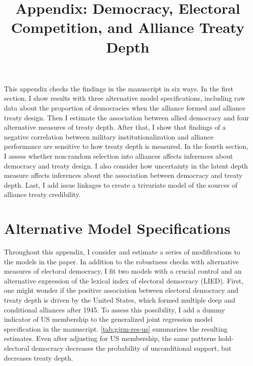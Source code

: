 \documentclass[12pt]{article}
\title{\textbf{Appendix: Democracy, Electoral Competition, and Alliance Treaty Depth}}
\author{}
\date{}
\begin{document}
\maketitle 

\doublespace 

This appendix checks the findings in the manuscript in six ways. 
In the first section, I show results with three alternative model specifications, including raw data about the proportion of democracies when the alliance formed and alliance treaty design.
Then I estimate the association between allied democracy and four alternative measures of treaty depth.
After that, I show that findings of a negative correlation between military institutionalization and alliance performance are sensitive to how treaty depth is measured. 
In the fourth section, I assess whether non-random selection into alliances affects inferences about democracy and treaty design.   
I also consider how uncertainty in the latent depth measure affects inferences about the association between democracy and treaty depth. 
Last, I add issue linkages to create a trivariate model of the sources of alliance treaty credibility. 


\section{Alternative Model Specifications} 


Throughout this appendix, I consider and estimate a series of modifications to the models in the paper.
In addition to the robustness checks with alternative measures of electoral democracy, I fit two models with a crucial control and an alternative expression of the lexical index of electoral democracy (LIED). 
First, one might wonder if the positive association between electoral democracy and treaty depth is driven by the United States, which formed multiple deep and conditional alliances after 1945. 
To assess this possibility, I add a dummy indicator of US membership to the generalized joint regression model specification in the manuscript. 
\autoref{tab:gjrm-res-us} summarizes the resulting estimates. 
Even after adjusting for US membership, the same patterns hold- electoral democracy decreases the probability of unconditional support, but decreases treaty depth. 
 
\end{document}
